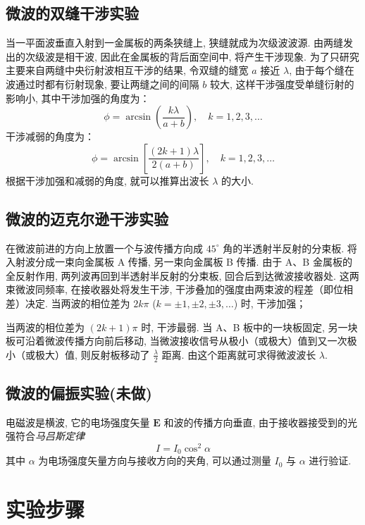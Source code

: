 \documentclass[zihao=5, UTF8]{article}
\theoremstyle{MyLineTheoremStyle} %
\theoremstyle{MyBlockTheoremStyle} %
\theoremstyle{MySubsubsectionStyle} %
\begin{document}
\subsection{微波的双缝干涉实验}
当一平面波垂直入射到一金属板的两条狭缝上, 狭缝就成为次级波波源. 由两缝发出的次级波是相干波, 因此在金属板的背后面空间中, 将产生干涉现象. 为了只研究主要来自两缝中央衍射波相互干涉的结果, 令双缝的缝宽 $a$ 接近 $\lambda$, 由于每个缝在波通过时都有衍射现象, 要让两缝之间的间隔 $b$ 较大, 这样干涉强度受单缝衍射的影响小, 其中干涉加强的角度为：
\begin{equation}
\phi = \arcsin \left( \frac{k \lambda}{a+b} \right), \quad k = 1, 2, 3, \ldots
\end{equation}
干涉减弱的角度为：
\begin{equation}
\phi = \arcsin \left[ \frac{(2k + 1) \lambda}{2(a + b)} \right], \quad k = 1, 2, 3, \ldots
\end{equation}
根据干涉加强和减弱的角度, 就可以推算出波长 $\lambda$ 的大小. 

\subsection{微波的迈克尔逊干涉实验}
在微波前进的方向上放置一个与波传播方向成 $45^\circ$ 角的半透射半反射的分束板. 将入射波分成一束向金属板 A 传播, 另一束向金属板 B 传播. 由于 A、B 金属板的全反射作用, 两列波再回到半透射半反射的分束板, 回合后到达微波接收器处. 这两束微波同频率, 在接收器处将发生干涉, 干涉叠加的强度由两束波的程差（即位相差）决定. 当两波的相位差为 $2k\pi$ ($k = \pm 1, \pm 2, \pm 3, \ldots$) 时, 干涉加强；

当两波的相位差为 $(2k + 1)\pi$ 时, 干涉最弱. 当 A、B 板中的一块板固定, 另一块板可沿着微波传播方向前后移动, 当微波接收信号从极小（或极大）值到又一次极小（或极大）值, 则反射板移动了 $\frac{\lambda}{2}$ 距离. 由这个距离就可求得微波波长 $\lambda$. 

\subsection{微波的偏振实验(未做)}
电磁波是横波, 它的电场强度矢量 $\boldsymbol E$ 和波的传播方向垂直, 由于接收器接受到的光强符合\textit{马吕斯定律}
\begin{equation}
I = I_0 \cos^2 \alpha
\end{equation}
其中 $\alpha$ 为电场强度矢量方向与接收方向的夹角, 可以通过测量 $I_0$ 与 $\alpha$ 进行验证. 
\section{实验步骤}
\end{document}
